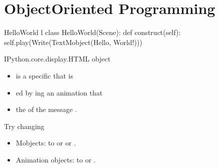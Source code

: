 \documentclass[letterpaper,10pt,english]{sphinxmanual}
\begin{document}
\section{Object\sphinxhyphen{}Oriented Programming}
\label{\detokenize{Lecture5/Objects:object-oriented-programming}}

\begin{sphinxVerbatim}[commandchars=\\\{\}]
 
   
\end{sphinxVerbatim}

\begin{sphinxVerbatim}[commandchars=\\\{\}]
 HelloWorld \PYGZhy{}l
class HelloWorld(Scene):
    def construct(self):
        self.play(Write(TextMobject(\PYGZsq{}Hello, World!\PYGZsq{})))
\end{sphinxVerbatim}

\begin{sphinxVerbatim}[commandchars=\\\{\}]
\PYGZlt{}IPython.core.display.HTML object\PYGZgt{}
\end{sphinxVerbatim}
\begin{itemize}
\item {} 
 is a specific  that is

\item {} 
ed by ing an animation that 

\item {} 
the  of the message .

\end{itemize}

 Try changing
\begin{itemize}
\item {} 
Mobjects:  to  or  or .

\item {} 
Animation objects:  to  or .

\end{itemize}
\end{document}
